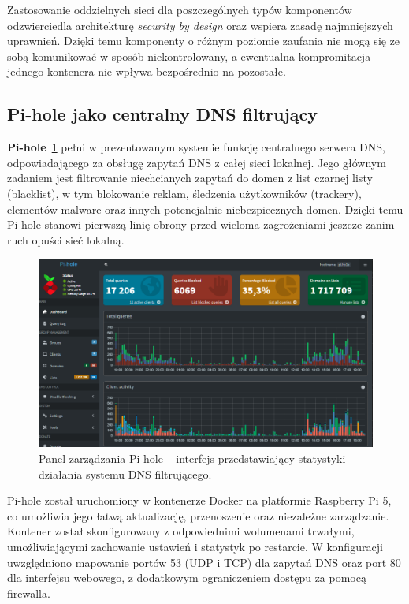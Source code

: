 \documentclass[
    left=2.5cm,         %
    right=2.5cm,        %
    top=2.5cm,          %
    bottom=3cm,         %
    bindingoffset=6mm,  %
    nohyphenation=true %
]{eiti/eiti-thesis} %
\begin{document}
Zastosowanie oddzielnych sieci dla poszczególnych typów komponentów odzwierciedla architekturę \textit{security by design} oraz wspiera zasadę najmniejszych uprawnień. Dzięki temu komponenty o różnym poziomie zaufania nie mogą się ze sobą komunikować w sposób niekontrolowany, a ewentualna kompromitacja jednego kontenera nie wpływa bezpośrednio na pozostałe.

\newpage 
\subsection{Pi-hole jako centralny DNS filtrujący}

\textbf{Pi-hole}~\ref{fig:pihole-dashboard} pełni w prezentowanym systemie funkcję centralnego serwera DNS, odpowiadającego za obsługę zapytań DNS z całej sieci lokalnej. Jego głównym zadaniem jest filtrowanie niechcianych zapytań do domen z list czarnej listy (blacklist), w tym blokowanie reklam, śledzenia użytkowników (trackery), elementów malware oraz innych potencjalnie niebezpiecznych domen. Dzięki temu Pi-hole \cite{pihole-docs} stanowi pierwszą linię obrony przed wieloma zagrożeniami jeszcze zanim ruch opuści sieć lokalną.
\begin{figure}[H]
    \centering
    \includegraphics[width=\textwidth]{img/pihole.png}
    \caption{Panel zarządzania Pi-hole – interfejs przedstawiający statystyki działania systemu DNS filtrującego.}
    \label{fig:pihole-dashboard}
\end{figure}


Pi-hole został uruchomiony w kontenerze Docker na platformie Raspberry Pi 5, co umożliwia jego łatwą aktualizację, przenoszenie oraz niezależne zarządzanie. Kontener został skonfigurowany z odpowiednimi wolumenami trwałymi, umożliwiającymi zachowanie ustawień i statystyk po restarcie\cite{config-pihole}. W konfiguracji uwzględniono mapowanie portów 53 (UDP i TCP) dla zapytań DNS oraz port 80 dla interfejsu webowego, z dodatkowym ograniczeniem dostępu za pomocą firewalla.
\end{document}
